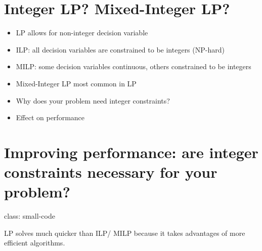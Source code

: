 \documentclass[
]{article}
\providecommand{\tightlist}{%
  \setlength{\itemsep}{0pt}\setlength{\parskip}{0pt}}
\begin{document}
\hypertarget{integer-lp-mixed-integer-lp}{%
\section{Integer LP? Mixed-Integer
LP?}\label{integer-lp-mixed-integer-lp}}

\begin{itemize}
\tightlist
\item
  LP allows for non-integer decision variable
\item
  ILP: all decision variables are constrained to be integers (NP-hard)
\item
  MILP: some decision variables continuous, others constrained to be
  integers
\item
  Mixed-Integer LP most common in LP
\item
  Why does your problem need integer constraints?
\item
  Effect on performance
\end{itemize}

\hypertarget{improving-performance-are-integer-constraints-necessary-for-your-problem}{%
\section{Improving performance: are integer constraints necessary for
your
problem?}\label{improving-performance-are-integer-constraints-necessary-for-your-problem}}

class: small-code

LP solves much quicker than ILP/ MILP because it takes advantages of
more efficient algorithms.
\end{document}
